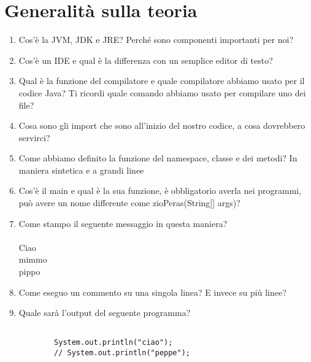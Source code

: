 \documentclass{article}
\begin{document}
\section{Generalità sulla teoria}

\begin{enumerate}

    \item Cos'è la JVM, JDK e JRE? Perché sono componenti importanti per noi?
    
    \item Cos'è un IDE e qual è la differenza con un semplice editor di testo?
    
    \item Qual è la funzione del compilatore e quale compilatore abbiamo usato per il codice Java? 
    Ti ricordi quale comando abbiamo usato per compilare uno dei file?

    \item Cosa sono gli import che sono all'inizio del nostro codice, a cosa dovrebbero servirci?
    
    \item Come abbiamo definito la funzione del namespace, classe e dei metodi? In maniera sintetica e a grandi linee 

    \item Cos'è il main e qual è la sua funzione, è obbligatorio averla nei programmi, può avere un nome differente come zioPeras(String[] args)?

    \item Come stampo il seguente messaggio in questa maniera? \\ \\
    Ciao \\
    mimmo \\
    pippo \\

    \item Come eseguo un commento su una singola linea? E invece su più linee?

    \item Quale sarà l'output del seguente programma?
    
    \begin{verbatim}
        
        System.out.println("ciao");
        // System.out.println("peppe");

    \end{verbatim}

\end{enumerate}
\end{document}
